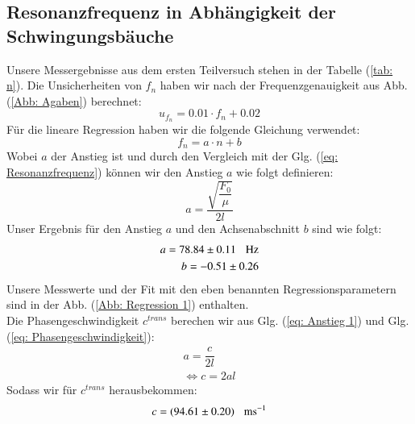 \documentclass[bibliography=totocnumbered]{scrartcl}
\begin{document}
	\subsection{Resonanzfrequenz in Abhängigkeit der Schwingungsbäuche}
	
	Unsere Messergebnisse aus dem ersten Teilversuch stehen in der Tabelle (\ref{tab: n}). Die Unsicherheiten von $ f_{n} $ haben wir nach der Frequenzgenauigkeit aus Abb. (\ref{Abb: Agaben}) berechnet:
	\begin{equation}\label{eq: Unsicherheit von f_n}
		u_{f_{n}}=0.01\cdot f_{n}+0.02
	\end{equation}
	Für die lineare Regression haben wir die folgende Gleichung verwendet:
	\begin{equation}\label{eq: Regression 1}
		f_{n}=a\cdot n+b
	\end{equation}
	Wobei $ a $ der Anstieg ist und durch den Vergleich mit der Glg. (\ref{eq: Resonanzfrequenz}) können wir den Anstieg $ a $ wie folgt definieren:
	\begin{equation}\label{eq: Anstieg 1}
		a=\dfrac{\sqrt{\dfrac{F_{0}}{\mu}}}{2l}
	\end{equation}
	Unser Ergebnis für den Anstieg $ a $ und den Achsenabschnitt $ b $ sind wie folgt: 
	\begin{align}\label{eq: Regressionparameter 1}
		a=78.84\pm 0.11 \hspace{3mm}\text{Hz}\\
		b=-0.51\pm 0.26  %
	\end{align}
	Unsere Messwerte und der Fit mit den eben benannten Regressionsparametern sind in der Abb. (\ref{Abb: Regression 1}) enthalten.\\
	Die Phasengeschwindigkeit $ c^{trans} $ berechen wir aus Glg. (\ref{eq: Anstieg 1}) und Glg. (\ref{eq: Phasengeschwindigkeit}):
	\begin{align}
		a=\dfrac{c}{2l}\\
		\Leftrightarrow c=2al
	\end{align}
	Sodass wir für $ c^{trans} $ herausbekommen:
	\begin{equation}\label{eq: c_trans ergebnis}
		c=(94.61\pm0.20) \hspace{3mm} \text{ms$ ^{-1} $}
	\end{equation}
	\newpage
	
\end{document}
